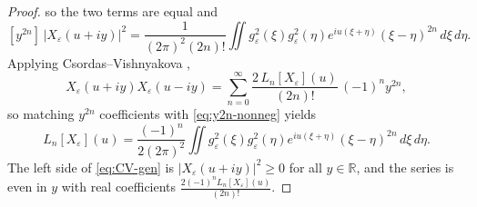 \documentclass[12pt]{amsart}
\theoremstyle{remark}
\begin{document}
\begin{proof}
so the two terms are equal and
\begin{equation}\label{eq:y2n-nonneg}
  [y^{2n}]\,|X_\varepsilon(u+iy)|^2
  =\frac{1}{(2\pi)^2(2n)!}\iint g_\varepsilon^2(\xi)g_\varepsilon^2(\eta)
   e^{iu(\xi+\eta)}(\xi-\eta)^{2n}\,d\xi\,d\eta.
\end{equation}
Applying Csordas--Vishnyakova \cite[eq.~(1)]{CV},
\begin{equation}\label{eq:CV-gen}
  X_\varepsilon(u+iy)X_\varepsilon(u-iy)
  =\sum_{n=0}^{\infty}\frac{2\,L_n[X_\varepsilon](u)}{(2n)!}\,(-1)^n y^{2n},
\end{equation}
so matching $y^{2n}$ coefficients with \eqref{eq:y2n-nonneg} yields
\begin{equation}\label{eq:Ln-int}
  L_n[X_\varepsilon](u)
  =\frac{(-1)^n}{2(2\pi)^2}\iint g_\varepsilon^2(\xi)g_\varepsilon^2(\eta)
   e^{iu(\xi+\eta)}(\xi-\eta)^{2n}\,d\xi\,d\eta.
\end{equation}
The left side of \eqref{eq:CV-gen} is $|X_\varepsilon(u+iy)|^2\geq 0$
for all $y\in\mathbb{R}$, and the series is even in $y$ with real
coefficients $\frac{2(-1)^n L_n[X_\varepsilon](u)}{(2n)!}$.


\end{proof}
\end{document}
